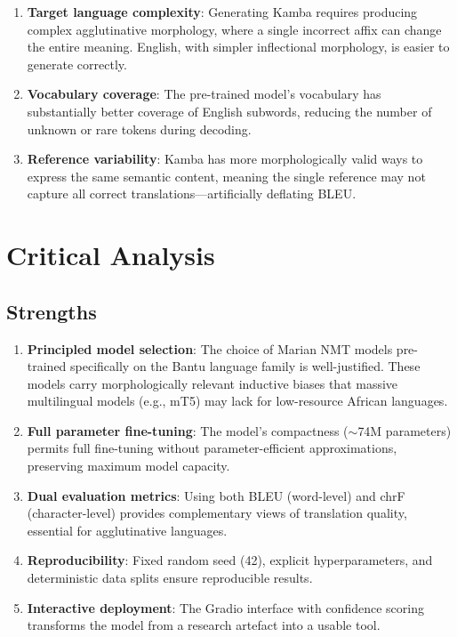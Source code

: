 \documentclass[12pt,a4paper]{article}
\begin{document}
\begin{enumerate}
    \item \textbf{Target language complexity}: Generating Kamba requires producing complex agglutinative morphology, where a single incorrect affix can change the entire meaning. English, with simpler inflectional morphology, is easier to generate correctly.
    \item \textbf{Vocabulary coverage}: The pre-trained model's vocabulary has substantially better coverage of English subwords, reducing the number of unknown or rare tokens during decoding.
    \item \textbf{Reference variability}: Kamba has more morphologically valid ways to express the same semantic content, meaning the single reference may not capture all correct translations---artificially deflating BLEU.
\end{enumerate}

\section{Critical Analysis}

\subsection{Strengths}

\begin{enumerate}
    \item \textbf{Principled model selection}: The choice of Marian NMT models pre-trained specifically on the Bantu language family is well-justified. These models carry morphologically relevant inductive biases that massive multilingual models (e.g., mT5) may lack for low-resource African languages.
    \item \textbf{Full parameter fine-tuning}: The model's compactness ($\sim$74M parameters) permits full fine-tuning without parameter-efficient approximations, preserving maximum model capacity.
    \item \textbf{Dual evaluation metrics}: Using both BLEU (word-level) and chrF (character-level) provides complementary views of translation quality, essential for agglutinative languages.
    \item \textbf{Reproducibility}: Fixed random seed (42), explicit hyperparameters, and deterministic data splits ensure reproducible results.
    \item \textbf{Interactive deployment}: The Gradio interface with confidence scoring transforms the model from a research artefact into a usable tool.
\end{enumerate}
\end{document}

